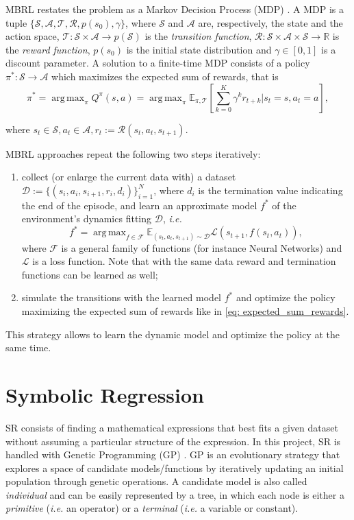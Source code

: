 \documentclass[11pt]{article}
\newcommand{\rr}{\mathbb{R}}
\DeclareMathOperator*{\argmax}{arg\,max}
\begin{document}
MBRL restates the problem as a Markov Decision Process (MDP) \cite{puterman2014}. A MDP is a tuple $\{\mathcal{S}, \mathcal{A}, \mathcal{T}, \mathcal{R}, p(s_0), \gamma\}$, where $\mathcal{S}$ and $\mathcal{A}$ are, respectively, the state and the action space, $\mathcal{T}: \mathcal{S} \times \mathcal{A} \rightarrow p(\mathcal{S})$ is the \textsl{transition function}, $\mathcal{R}: \mathcal{S} \times \mathcal{A} \times \mathcal{S} \rightarrow \rr$ is the \textsl{reward function}, $p(s_0)$ is the initial state distribution and $\gamma \in [0,1]$ is a discount parameter.
A solution to a finite-time MDP consists of a policy $\pi^*: \mathcal{S} \rightarrow \mathcal{A}$ which maximizes the expected sum of rewards, that is
\begin{equation}
	\pi^* = \argmax_{\pi} Q^{\pi}(s,a) = \argmax_{\pi} \mathbb{E}_{\pi, \mathcal{T}}\left[\sum_{k=0}^K \gamma^k r_{t+k} | s_t = s, a_t = a \right], \label{eq: expected_sum_rewards}
\end{equation}

where $s_t \in \mathcal{S}, a_t \in \mathcal{A}, r_t := \mathcal{R}(s_t, a_t, s_{t+1})$.

MBRL approaches repeat the following two steps iteratively:
\begin{enumerate}
	\item collect (or enlarge the current data with) a dataset $\mathcal{D} := \{(s_i, a_i, s_{i+1}, r_i, d_i)\}_{i=1}^N$, where $d_i$ is the termination value indicating the end of the episode, and learn an approximate model $f^*$ of the environment's dynamics fitting $\mathcal{D}$, \textsl{i.e.}
	\begin{equation}
		f^* = \argmax_{f \in \mathcal{F}} \mathbb{E}_{(s_t, a_t, s_{t+1}) \sim \mathcal{D}} \mathcal{L}(s_{t+1}, f(s_t, a_t)),
	\end{equation}
	where $\mathcal{F}$ is a general family of functions (for instance Neural Networks) and $\mathcal{L}$ is a loss function. Note that with the same data reward and termination functions can be learned as well;
	\item simulate the transitions with the learned model $f^*$ and optimize the policy maximizing the expected sum of rewards like in \eqref{eq: expected_sum_rewards}.
\end{enumerate}

This strategy allows to learn the dynamic model and optimize the policy at the same time.

\section{Symbolic Regression}
SR consists of finding a mathematical expressions that best fits a given dataset without assuming a particular structure of the expression. 
In this project, SR is handled with Genetic Programming (GP) \cite{koza1994genetic, o2009riccardo}. GP is an evolutionary strategy that explores a space of candidate models/functions by iteratively updating an initial population through genetic operations. A candidate model is also called \textsl{individual} and can be easily represented by a tree, in which each node is either a \textsl{primitive} (\textsl{i.e.} an operator) or a \textsl{terminal} (\textsl{i.e.} a variable or constant).
\end{document}

